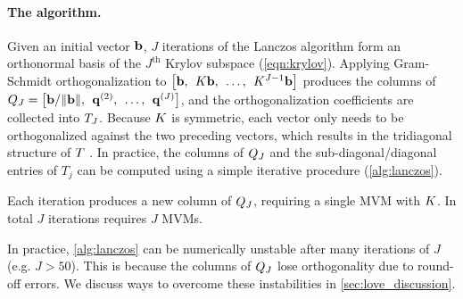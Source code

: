 \paragraph{The algorithm.}
Given an initial vector $\mathbf{b}$, $J$ iterations of the Lanczos algorithm form an orthonormal basis of the $J^\text{th}$ Krylov subspace (\cref{eqn:krylov}).
Applying Gram-Schmidt orthogonalization to $\left[ \mathbf{b}, \:\: K \mathbf{b}, \:\: \ldots, \:\: K^{J-1} \mathbf{b} \right]$ produces the columns of $Q_J = \left[ \mathbf{b}/\Vert \mathbf{b} \Vert, \:\: \mathbf{q}^{(2)}, \:\: \ldots, \:\: \mathbf{q}^{(J)} \right]$, and the orthogonalization coefficients are collected into $T_J$.
Because $K$ is symmetric, each vector only needs to be orthogonalized against the two preceding vectors, which results in the tridiagonal structure of $T$ \cite{golub2012matrix}.
In practice, the columns of $Q_J$ and the sub-diagonal/diagonal entries of $T_j$ can be computed using a simple iterative procedure (\cref{alg:lanczos}).
%

%
Each iteration produces a new column of $Q_J$, requiring a single MVM with $K$.
In total $J$ iterations requires $J$ MVMs.

In practice, \cref{alg:lanczos} can be numerically unstable after many iterations of $J$ (e.g. $J > 50$).
This is because the columns of $Q_J$ lose orthogonality due to round-off errors.
We discuss ways to overcome these instabilities in \cref{sec:love_discussion}.




